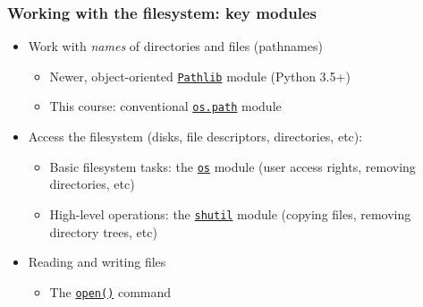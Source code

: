 \documentclass[xcolor=table]{beamer}
\begin{document}
\begin{frame}[fragile]
    \frametitle{Working with the filesystem: key modules}
\begin{itemize}\addtolength{\itemsep}{\baselineskip}
    \item Work with \emph{names} of directories and files (pathnames) \pause
    \begin{itemize}
        \item Newer, object-oriented \href{https://docs.python.org/3/library/pathlib.html#module-pathlib}{\texttt{Pathlib}} module (Python 3.5+) \pause
        \item This course: conventional \href{https://docs.python.org/3.7/library/os.path.html}{\texttt{os.path}} module \pause
    \end{itemize}
\item Access the filesystem (disks, file descriptors, directories, etc): \pause
    \begin{itemize}
        \item Basic filesystem tasks: the \href{https://docs.python.org/3.7/library/os.html#module-os}{\texttt{os}} module (user access rights, removing directories, etc) \pause
        \item High-level operations: the \href{https://docs.python.org/3/library/shutil.html}{\texttt{shutil}} module (copying files, removing directory trees, etc)  \pause
    \end{itemize}
\item Reading and writing files
    \begin{itemize}
        \item The \href{https://docs.python.org/3/library/functions.html#open}{\texttt{open()}} command \pause
    \end{itemize}
\end{itemize}
\end{frame}

\end{document}
